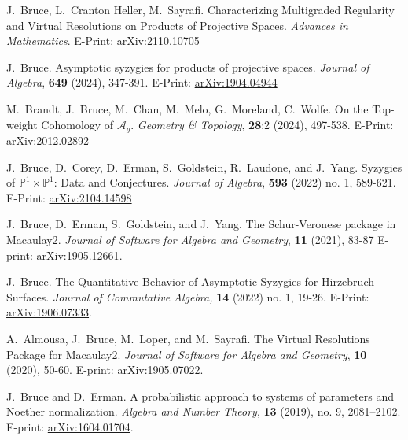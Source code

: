 \documentclass[letterpaper,11pt]{article}
\begin{document}
\begin{revnumerate}[21]
	
\item
	J.~Bruce, L.~Cranton Heller, M.~Sayrafi. Characterizing Multigraded Regularity and Virtual Resolutions on Products of Projective Spaces.  {\it Advances in Mathematics}. E-Print:  \hyperref{https://arxiv.org/abs/2110.10705}{}{}{arXiv:2110.10705}	

\item
	J.~Bruce. Asymptotic syzygies for products of projective spaces.  {\it Journal of Algebra}, \textbf{649} (2024),  347-391. E-Print:  \hyperref{https://arxiv.org/abs/1904.04944}{}{}{arXiv:1904.04944}

\item
	M.~Brandt, J.~Bruce, M.~Chan, M.~Melo, G.~Moreland, C.~Wolfe. On the Top-weight Cohomology of $\mathcal{A}_{g}$.  {\it Geometry \& Topology}, \textbf{28}:2 (2024), 497-538. E-Print:  \hyperref{https://arxiv.org/abs/2012.02892}{}{}{arXiv:2012.02892}
	
\item
	J.~Bruce, D.~Corey, D.~Erman, S.~Goldstein, R.~Laudone, and J.~Yang. Syzygies of $\mathbb{P}^{1}\times\mathbb{P}^{1}$: Data and Conjectures.  {\it Journal of Algebra}, \textbf{593} (2022) no. 1,  589-621. E-Print:  \hyperref{https://arxiv.org/abs/2104.14598}{}{}{arXiv:2104.14598}
	
\item
	J.~Bruce, D.~Erman, S.~Goldstein, and J.~Yang. The Schur-Veronese package in Macaulay2.  {\it Journal of Software for Algebra and Geometry}, \textbf{11} (2021), 83-87 E-print: \hyperref{https://arxiv.org/abs/1905.12661}{}{}{arXiv:1905.12661}.
	
\item
	J.~Bruce. The Quantitative Behavior of Asymptotic Syzygies for Hirzebruch Surfaces. {\it Journal of Commutative Algebra,} \textbf{14} (2022) no. 1, 19-26. E-Print:  \hyperref{http://arxiv.org/abs/1906.07333}{}{}{arXiv:1906.07333}.
	
\item
	A.~Almousa, J.~Bruce, M.~Loper, and M.~Sayrafi. The Virtual Resolutions Package for Macaulay2.  {\it Journal of Software for Algebra and Geometry}, \textbf{10} (2020), 50-60. E-print: \hyperref{http://arxiv.org/abs/1905.07022}{}{}{arXiv:1905.07022}.
	
\item
	J.~Bruce and D.~Erman. A probabilistic approach to systems of parameters and Noether normalization. {\it Algebra and Number Theory}, \textbf{13} (2019), no. 9, 2081–2102. E-print: \hyperref{http://arxiv.org/abs/1604.01704}{}{}{arXiv:1604.01704}.
	

\end{revnumerate}
\end{document}
